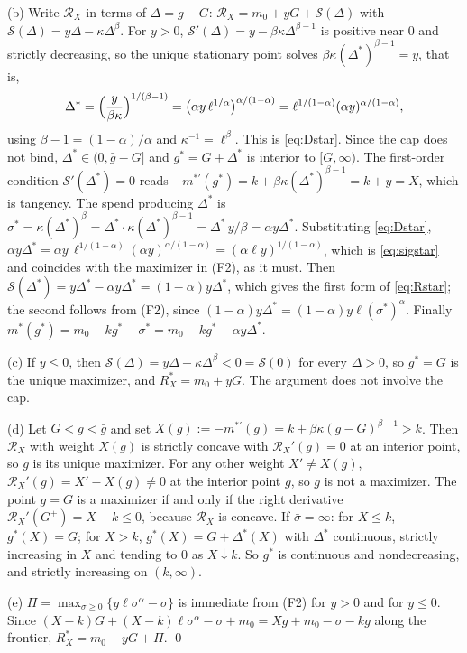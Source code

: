 (b) Write $\mathcal R_X$ in terms of $\Delta=g-G$: $\mathcal R_X=m_0+yG+\mathcal S(\Delta)$ with $\mathcal S(\Delta)=y\Delta-\kappa\Delta^{\beta}$. For $y>0$, $\mathcal S'(\Delta)=y-\beta\kappa\Delta^{\beta-1}$ is positive near $0$ and strictly decreasing, so the unique stationary point solves $\beta\kappa(\Delta^*)^{\beta-1}=y$, that is,
\[
\Delta^*=\Bigl(\frac{y}{\beta\kappa}\Bigr)^{1/(\beta-1)}=\bigl(\alpha y\,\ell^{1/\alpha}\bigr)^{\alpha/(1-\alpha)}=\ell^{1/(1-\alpha)}(\alpha y)^{\alpha/(1-\alpha)},
\]
using $\beta-1=(1-\alpha)/\alpha$ and $\kappa^{-1}=\ell^{\beta}$. This is \eqref{eq:Dstar}. Since the cap does not bind, $\Delta^*\in(0,\bar g-G]$ and $g^*=G+\Delta^*$ is interior to $[G,\infty)$. The first-order condition $\mathcal S'(\Delta^*)=0$ reads $-m^{*\prime}(g^*)=k+\beta\kappa(\Delta^*)^{\beta-1}=k+y=X$, which is tangency. The spend producing $\Delta^*$ is $\sigma^*=\kappa(\Delta^*)^{\beta}=\Delta^*\cdot\kappa(\Delta^*)^{\beta-1}=\Delta^*\,y/\beta=\alpha y\Delta^*$. Substituting \eqref{eq:Dstar}, $\alpha y\Delta^*=\alpha y\,\ell^{1/(1-\alpha)}(\alpha y)^{\alpha/(1-\alpha)}=(\alpha\ell y)^{1/(1-\alpha)}$, which is \eqref{eq:sigstar} and coincides with the maximizer in (F2), as it must. Then $\mathcal S(\Delta^*)=y\Delta^*-\alpha y\Delta^*=(1-\alpha)y\Delta^*$, which gives the first form of \eqref{eq:Rstar}; the second follows from (F2), since $(1-\alpha)y\Delta^*=(1-\alpha)y\ell(\sigma^*)^{\alpha}$. Finally $m^*(g^*)=m_0-kg^*-\sigma^*=m_0-kg^*-\alpha y\Delta^*$.

(c) If $y\le 0$, then $\mathcal S(\Delta)=y\Delta-\kappa\Delta^{\beta}<0=\mathcal S(0)$ for every $\Delta>0$, so $g^*=G$ is the unique maximizer, and $R_X^*=m_0+yG$. The argument does not involve the cap.

(d) Let $G<g<\bar g$ and set $X(g):=-m^{*\prime}(g)=k+\beta\kappa(g-G)^{\beta-1}>k$. Then $\mathcal R_X$ with weight $X(g)$ is strictly concave with $\mathcal R_X'(g)=0$ at an interior point, so $g$ is its unique maximizer. For any other weight $X'\ne X(g)$, $\mathcal R_X'(g)=X'-X(g)\ne 0$ at the interior point $g$, so $g$ is not a maximizer. The point $g=G$ is a maximizer if and only if the right derivative $\mathcal R_X'(G^+)=X-k\le 0$, because $\mathcal R_X$ is concave. If $\bar\sigma=\infty$: for $X\le k$, $g^*(X)=G$; for $X>k$, $g^*(X)=G+\Delta^*(X)$ with $\Delta^*$ continuous, strictly increasing in $X$ and tending to $0$ as $X\downarrow k$. So $g^*$ is continuous and nondecreasing, and strictly increasing on $(k,\infty)$.

(e) $\Pi=\max_{\sigma\ge 0}\{y\ell\sigma^{\alpha}-\sigma\}$ is immediate from (F2) for $y>0$ and for $y\le 0$. Since $(X-k)G+(X-k)\ell\sigma^{\alpha}-\sigma+m_0=Xg+m_0-\sigma-kg$ along the frontier, $R_X^*=m_0+yG+\Pi$. \qed


